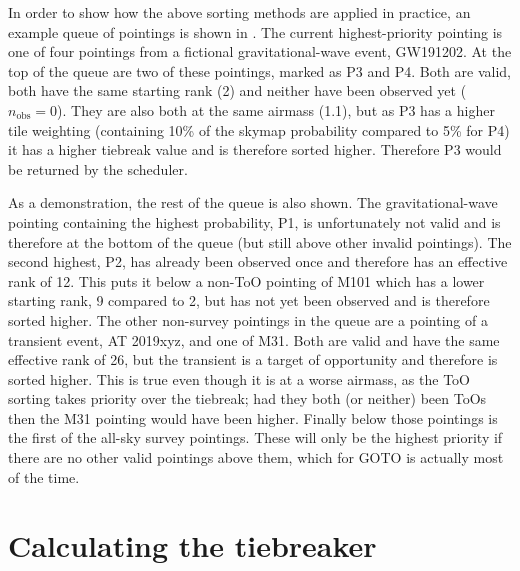 \begin{colsection}
In order to show how the above sorting methods are applied in practice, an example queue of pointings is shown in . The current highest-priority pointing is one of four pointings from a fictional gravitational-wave event, GW191202. At the top of the queue are two of these pointings, marked as P3 and P4. Both are valid, both have the same starting rank (2) and neither have been observed yet ($n_\text{obs}=0$). They are also both at the same airmass (1.1), but as P3 has a higher tile weighting (containing 10\% of the skymap probability compared to 5\% for P4) it has a higher tiebreak value and is therefore sorted higher. Therefore P3 would be returned by the scheduler.

As a demonstration, the rest of the queue is also shown. The gravitational-wave pointing containing the highest probability, P1, is unfortunately not valid and is therefore at the bottom of the queue (but still above other invalid pointings). The second highest, P2, has already been observed once and therefore has an effective rank of 12. This puts it below a non-ToO pointing of M101 which has a lower starting rank, 9 compared to 2, but has not yet been observed and is therefore sorted higher. The other non-survey pointings in the queue are a pointing of a transient event, AT 2019xyz, and one of M31. Both are valid and have the same effective rank of 26, but the transient is a target of opportunity and therefore is sorted higher. This is true even though it is at a worse airmass, as the ToO sorting takes priority over the tiebreak; had they both (or neither) been ToOs then the M31 pointing would have been higher. Finally below those pointings is the first of the all-sky survey pointings. These will only be the highest priority if there are no other valid pointings above them, which for GOTO is actually most of the time.

\end{colsection}


\section{Calculating the tiebreaker}
\label{sec:scheduler_tiebreaker}


